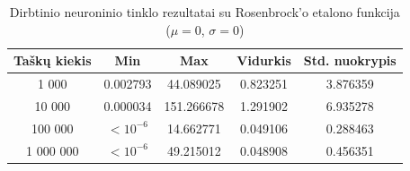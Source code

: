 \begin{table}[H]
    \centering
    \begin{tabular}{|c|c|c|c|c|}
        \hline
        \textbf{Taškų kiekis} & \textbf{Min} & \textbf{Max} & \textbf{Vidurkis} & \textbf{Std. nuokrypis} \\ \hline
        1 000        & 0.002793 & 44.089025 & 0.823251 & 3.876359 \\ \hline
        10 000       & 0.000034 & 151.266678 & 1.291902 & 6.935278 \\ \hline
        100 000      & $<10^{-6}$ & 14.662771 & 0.049106 & 0.288463 \\ \hline
        1 000 000    & $<10^{-6}$ & 49.215012 & 0.048908 & 0.456351 \\ \hline
    \end{tabular}
    \caption{Dirbtinio neuroninio tinklo rezultatai su Rosenbrock'o etalono funkcija ($\mu = 0$, $\sigma = 0$)}
\end{table}